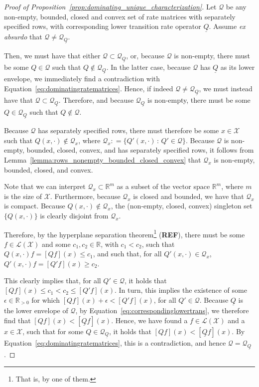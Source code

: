 \documentclass[10pt,a4paper]{paper}
\theoremstyle{definition}
\newcommand{\reals}{\mathbb{R}}
\newcommand{\realspos}{\reals_{>0}}
\newcommand{\states}{\mathcal{X}}
\newcommand{\gambles}{\mathcal{L}}
\newcommand{\gamblesX}{\gambles(\states)}
\newcommand{\rateset}{\mathcal{Q}}
\newcommand{\lrate}{\underline{Q}}
\newcommand{\coloneqq}{:\!=}
\begin{document}
\begin{proof}[Proof of Proposition~\ref{prop:dominating_unique_characterization}]
Let $\rateset$ be any non-empty, bounded, closed and convex set of rate matrices with separately specified rows, with corresponding lower transition rate operator $\lrate$. Assume \emph{ex absurdo} that $\rateset\neq\rateset_{\lrate}$.

Then, we must have that either $\rateset\subset\rateset_{\lrate}$, or, because $\rateset$ is non-empty, there must be some $Q\in\rateset$ such that $Q\notin\rateset_{\lrate}$. In the latter case, because $\rateset$ has $\lrate$ as its lower envelope, we immediately find a contradiction with Equation~\eqref{eq:dominatingratematrices}. Hence, if indeed $\rateset\neq\rateset_{\lrate}$, we must instead have that $\rateset\subset\rateset_{\lrate}$. Therefore, and because $\rateset_{\lrate}$ is non-empty, there must be some $Q\in\rateset_{\lrate}$ such that $Q\notin\rateset$.

Because $\rateset$ has separately specified rows, there must therefore be some $x\in\states$ such that $Q(x,\cdot)\notin\rateset_x$, where $\rateset_x\coloneqq\{Q'(x,\cdot)\,:\,Q'\in\rateset\}$. Because $\rateset$ is non-empty, bounded, closed, convex, and has separately specified rows, it follows from Lemma~\ref{lemma:rows_nonempty_bounded_closed_convex} that $\rateset_x$ is non-empty, bounded, closed, and convex. 

Note that we can interpret $\rateset_x\subset\reals^m$ as a subset of the vector space $\reals^m$, where $m$ is the size of $\states$. Furthermore, because $\rateset_x$ is closed and bounded, we have that $\rateset_x$ is compact. Because $Q(x,\cdot)\notin\rateset_x$, the (non-empty, closed, convex) singleton set $\{Q(x,\cdot)\}$ is clearly disjoint from $\rateset_x$.

Therefore, by the hyperplane separation theorem\footnote{That is, by one of them.} ({\bf REF}), there must be some $f\in\gamblesX$ and some $c_1,c_2\in\reals$, with $c_1<c_2$, such that $Q(x,\cdot)f = [Qf](x) \leq c_1$, and such that, for all $Q'(x,\cdot)\in\rateset_x$, $Q'(x,\cdot)f = [Q'f](x) \geq c_2$.

This clearly implies that, for all $Q'\in\rateset$, it holds that $[Qf](x) \leq c_1 < c_2 \leq [Q'f](x)$. In turn, this implies the existence of some $\epsilon\in\realspos$ for which $[Qf](x) + \epsilon < [Q'f](x)$, for all $Q'\in\rateset$. Because $\lrate$ is the lower envelope of $\rateset$, by Equation~\eqref{eq:correspondinglowertrans}, we therefore find that $[Qf](x) < [\lrate f](x)$. Hence, we have found a $f\in\gamblesX$ and a $x\in\states$, such that for some $Q\in\rateset_{\lrate}$, it holds that $[Qf](x) < [\lrate f](x)$. By Equation~\eqref{eq:dominatingratematrices}, this is a contradiction, and hence $\rateset=\rateset_{\lrate}$.
\end{proof}
\end{document}
